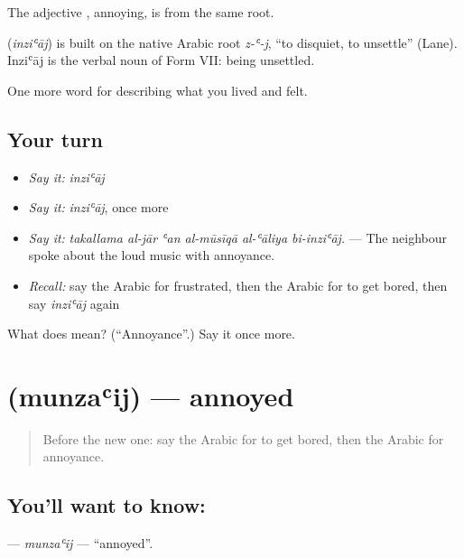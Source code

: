 The adjective , annoying, is from the same root.

\begin{cousinweb}
\textbf{} (\emph{inziʿāj}) is built on the native Arabic root \emph{z-ʿ-j}, \textquotedblleft{}to disquiet, to unsettle\textquotedblright{} (Lane). Inziʿāj is the verbal noun of Form VII: being unsettled.
\end{cousinweb}

\begin{grammarlens}[title={What you've built}]
One more word for describing what you lived and felt.
\end{grammarlens}

\subsection*{Your turn}
\begin{itemize}
\raggedright
  \item \emph{Say it:} \emph{inziʿāj}
  \item \emph{Say it:} \emph{inziʿāj}, once more
  \item \emph{Say it:} \emph{takallama al-jār ʿan al-mūsīqā al-ʿāliya bi-inziʿāj.} — The neighbour spoke about the loud music with annoyance.
  \item \emph{Recall:} say the Arabic for frustrated, then the Arabic for to get bored, then say \emph{inziʿāj} again
\end{itemize}

\begin{tcolorbox}[breakable,colback=teal!4,colframe=teal!35!black,title={Before you move on}]
What does  mean? (\textquotedblleft{}Annoyance\textquotedblright{}.) Say it once more.
\end{tcolorbox}
\section[\texorpdfstring{\ar{منزعج} (munzaʿij)}{منزعج (munzaʿij)}]{ (munzaʿij) — annoyed}

\label{lesson:AR-C495-munzaij}



\begin{quote}
Before the new one: say the Arabic for to get bored, then the Arabic for annoyance.
\end{quote}

\subsection*{You'll want to know: }
\textbf{} — \emph{munzaʿij} — \textquotedblleft{}annoyed\textquotedblright{}.

